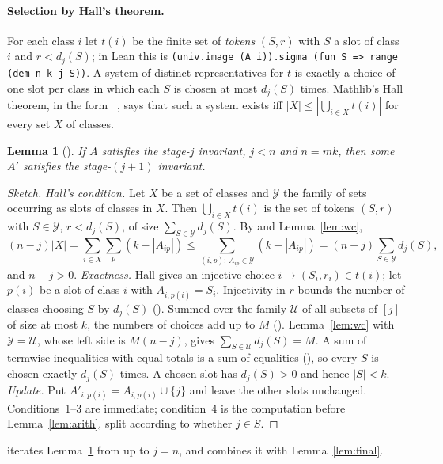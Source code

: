 \documentclass[11pt]{article}
\newtheorem{lemma}[theorem]{Lemma}
\theoremstyle{definition}
\theoremstyle{remark}
\newcommand{\lean}[1]{\texttt{#1}}
\begin{document}
\paragraph{Selection by Hall's theorem.} For each class $i$ let $t(i)$ be the finite set of
\emph{tokens} $(S,r)$ with $S$ a slot of class $i$ and $r<d_j(S)$; in Lean this is
\lean{(univ.image (A i)).sigma (fun S => range (dem n k j S))}. A system of distinct
representatives for $t$ is exactly a choice of one slot per class in which each $S$ is chosen at
most $d_j(S)$ times. Mathlib's Hall theorem, in the form
~\cite{Hall,HallLean}, says that such a
system exists iff $|X|\le|\bigcup_{i\in X}t(i)|$ for every set $X$ of classes.

\begin{lemma}[]\label{lem:step}
If $A$ satisfies the stage-$j$ invariant, $j<n$ and $n=mk$, then some $A'$ satisfies the
stage-$(j+1)$ invariant.
\end{lemma}
\begin{proof}[Sketch]
\emph{Hall's condition.} Let $X$ be a set of classes and $\mathcal Y$ the family of sets occurring
as slots of classes in $X$. Then $\bigcup_{i\in X}t(i)$ is the set of tokens $(S,r)$ with
$S\in\mathcal Y$, $r<d_j(S)$, of size $\sum_{S\in\mathcal Y}d_j(S)$. By 
and Lemma~\ref{lem:wc},
\[(n-j)|X|=\sum_{i\in X}\sum_p(k-|A_{ip}|)\le\sum_{(i,p):\,A_{ip}\in\mathcal Y}(k-|A_{ip}|)
=(n-j)\sum_{S\in\mathcal Y}d_j(S),\]
and $n-j>0$. \emph{Exactness.} Hall gives an injective choice $i\mapsto(S_i,r_i)\in t(i)$; let
$p(i)$ be a slot of class $i$ with $A_{i,p(i)}=S_i$. Injectivity in $r$ bounds the number of
classes choosing $S$ by $d_j(S)$ (). Summed over the family
$\mathcal U$ of all subsets of $[j]$ of size at most $k$, the numbers of choices add up to $M$
(). Lemma~\ref{lem:wc} with $\mathcal Y=\mathcal U$, whose
left side is $M(n-j)$, gives $\sum_{S\in\mathcal U}d_j(S)=M$. A sum of termwise inequalities with
equal totals is a sum of equalities (), so every $S$ is chosen
exactly $d_j(S)$ times. A chosen slot has $d_j(S)>0$ and hence $|S|<k$. \emph{Update.} Put
$A'_{i,p(i)}=A_{i,p(i)}\cup\{j\}$ and leave the other slots unchanged. Conditions~1--3 are
immediate; condition~4 is the computation before Lemma~\ref{lem:arith}, split according to whether
$j\in S$.
\end{proof}
 iterates Lemma~\ref{lem:step} from  up to $j=n$, and
 combines it with Lemma~\ref{lem:final}.
\end{document}
